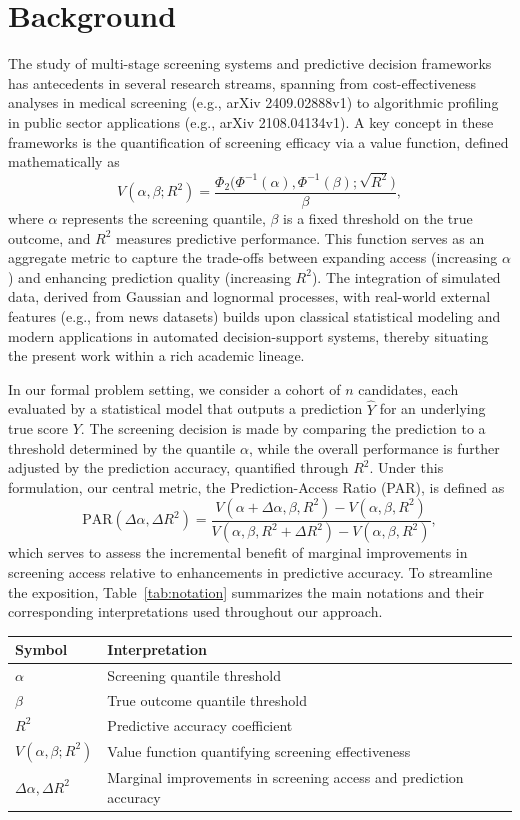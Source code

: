\documentclass[11pt]{article}
\begin{document}
\section{Background}
The study of multi-stage screening systems and predictive decision frameworks has antecedents in several research streams, spanning from cost-effectiveness analyses in medical screening (e.g., arXiv 2409.02888v1) to algorithmic profiling in public sector applications (e.g., arXiv 2108.04134v1). A key concept in these frameworks is the quantification of screening efficacy via a value function, defined mathematically as
\[
V(\alpha,\beta; R^2)=\frac{\Phi_2\Big(\Phi^{-1}(\alpha),\Phi^{-1}(\beta);\sqrt{R^2}\Big)}{\beta},
\]
where \(\alpha\) represents the screening quantile, \(\beta\) is a fixed threshold on the true outcome, and \(R^2\) measures predictive performance. This function serves as an aggregate metric to capture the trade-offs between expanding access (increasing \(\alpha\)) and enhancing prediction quality (increasing \(R^2\)). The integration of simulated data, derived from Gaussian and lognormal processes, with real-world external features (e.g., from news datasets) builds upon classical statistical modeling and modern applications in automated decision-support systems, thereby situating the present work within a rich academic lineage.

In our formal problem setting, we consider a cohort of \(n\) candidates, each evaluated by a statistical model that outputs a prediction \(\hat{Y}\) for an underlying true score \(Y\). The screening decision is made by comparing the prediction to a threshold determined by the quantile \(\alpha\), while the overall performance is further adjusted by the prediction accuracy, quantified through \(R^2\). Under this formulation, our central metric, the Prediction-Access Ratio (PAR), is defined as
\[
\text{PAR}(\Delta \alpha, \Delta R^2)=\frac{V(\alpha+\Delta \alpha,\beta,R^2)-V(\alpha,\beta,R^2)}{V(\alpha,\beta,R^2+\Delta R^2)-V(\alpha,\beta,R^2)},
\]
which serves to assess the incremental benefit of marginal improvements in screening access relative to enhancements in predictive accuracy. To streamline the exposition, Table~\ref{tab:notation} summarizes the main notations and their corresponding interpretations used throughout our approach.

\begin{center}
\begin{tabular}{|l|l|}
\hline
\textbf{Symbol} & \textbf{Interpretation} \\
\hline
\(\alpha\) & Screening quantile threshold \\
\(\beta\) & True outcome quantile threshold \\
\(R^2\) & Predictive accuracy coefficient \\
\(V(\alpha,\beta; R^2)\) & Value function quantifying screening effectiveness \\
\(\Delta \alpha, \Delta R^2\) & Marginal improvements in screening access and prediction accuracy \\
\hline
\end{tabular}
\end{center}
\end{document}

